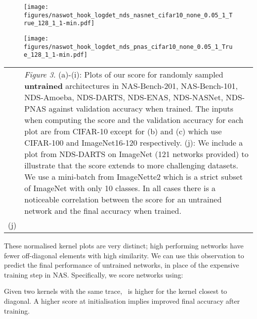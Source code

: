 \documentclass{article}
\begin{document}
\begin{figure*}[!ht]
\begin{subfigure}[b]{0.3\textwidth}
         \texttt{[image: figures/naswot\_hook\_logdet\_nds\_nasnet\_cifar10\_none\_0.05\_1\_True\_128\_1\_1-min.pdf]}
         \caption{}
     \end{subfigure}
     \hfill
     \begin{subfigure}[b]{0.3\textwidth}
         \centering
         \texttt{[image: figures/naswot\_hook\_logdet\_nds\_pnas\_cifar10\_none\_0.05\_1\_True\_128\_1\_1-min.pdf]}
         \caption{}
         \label{fig:resnet}
     \end{subfigure}
     

         \begin{tabular}{l p{.66\linewidth}}
             \raisebox{-.75\height}{\texttt{[image: figures/naswot\_hook\_logdet\_nds\_darts\_in\_imagenette2\_none\_0.05\_1\_True\_128\_1\_1-min.pdf]}}
             & 
             \textit{Figure 3.} (a)-(i): Plots of our score for randomly sampled {\bf untrained} architectures in 
   NAS-Bench-201,
   NAS-Bench-101,
   NDS-Amoeba,
   NDS-DARTS,
   NDS-ENAS,
   NDS-NASNet,
   NDS-PNAS
   against validation accuracy when trained. The inputs when computing the score and the validation accuracy for each plot are from CIFAR-10 except for (b) and (c) which use CIFAR-100 and ImageNet16-120 respectively. (j): We include a plot from NDS-DARTS on ImageNet (121 networks provided) to illustrate that the score extends to more challenging datasets. We use a mini-batch from ImageNette2 which is a strict subset of ImageNet with only 10 classes. In all cases there is a noticeable correlation between the score for an untrained network and the final accuracy when trained.    \\
   \quad\quad\quad\quad\quad\quad\quad(j) & \\
         \end{tabular}
    
    
    \label{fig:scoreplots} 

\end{figure*}

These normalised kernel plots are very distinct; high performing networks have fewer off-diagonal elements with high similarity. We can use this observation to predict the final performance of untrained networks, in place of the expensive training step in NAS.
Specifically, we score networks using:



Given two kernels with the same trace,~ is higher for the kernel closest to diagonal. A higher score at initialisation implies improved final accuracy after training.
\end{document}
